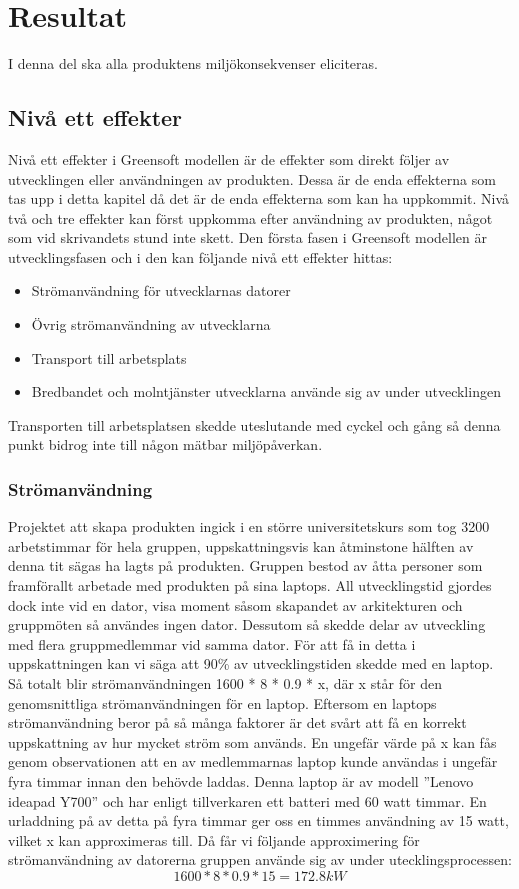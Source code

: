 \section{Resultat}
\label{sec:joel_a-results}
I denna del ska alla produktens miljökonsekvenser eliciteras. 

\subsection{Nivå ett effekter}
Nivå ett effekter i Greensoft modellen är de effekter som direkt följer av utvecklingen eller användningen av produkten. Dessa är de enda effekterna som tas upp i detta kapitel då det är de enda effekterna som kan ha uppkommit. Nivå två och tre effekter kan först uppkomma efter användning av produkten, något som vid skrivandets stund inte skett. Den första fasen i Greensoft modellen är utvecklingsfasen och i den kan följande nivå ett effekter hittas:
\begin{itemize}
	\item Strömanvändning för utvecklarnas datorer
	\item Övrig strömanvändning av utvecklarna
	\item Transport till arbetsplats
	\item Bredbandet och molntjänster utvecklarna använde sig av under utvecklingen
\end{itemize}

Transporten till arbetsplatsen skedde uteslutande med cyckel och gång så denna punkt bidrog inte till någon mätbar miljöpåverkan.

\subsubsection{Strömanvändning}
Projektet att skapa produkten ingick i en större universitetskurs som tog 3200 arbetstimmar för hela gruppen, uppskattningsvis kan åtminstone hälften av denna tit sägas ha lagts på produkten. Gruppen bestod av åtta personer som framförallt arbetade med produkten på sina laptops. All utvecklingstid gjordes dock inte vid en dator, visa moment såsom skapandet av arkitekturen och gruppmöten så användes ingen dator. Dessutom så skedde delar av utveckling med flera gruppmedlemmar vid samma dator. För att få in detta i uppskattningen kan vi säga att 90\% av utvecklingstiden skedde med en laptop. Så totalt blir strömanvändningen 1600 * 8 * 0.9 * x, där x står för den genomsnittliga strömanvändningen för en laptop. Eftersom en laptops strömanvändning beror på så många faktorer är det svårt att få en korrekt uppskattning av hur mycket ström som används. En ungefär värde på x kan fås genom observationen att en av medlemmarnas laptop kunde användas i ungefär fyra timmar innan den behövde laddas. Denna laptop är av modell ''Lenovo ideapad Y700'' och har enligt tillverkaren \cite{lenovo} ett batteri med 60 watt timmar. En urladdning på av detta på fyra timmar ger oss en timmes användning av 15 watt, vilket x kan approximeras till. Då får vi följande approximering för strömanvändning av datorerna gruppen använde sig av under utecklingsprocessen: $$1600 * 8 * 0.9 * 15 = 172.8kW$$


